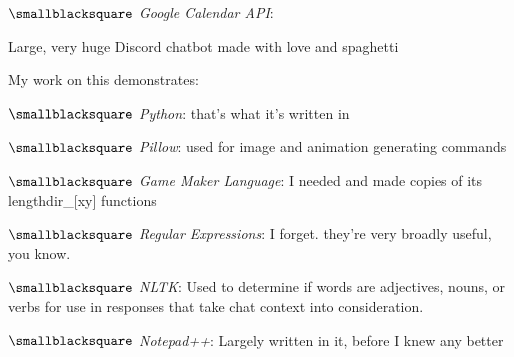 \documentclass[10mm,letterpaper,notitlepage]{article}
\begin{document}
{{								$\smallblacksquare$ \textit{Google Calendar API}: 
								
								\setlength{\parindent}{\parindent-4mm}
							\par}
							{\color[RGB]{0, 0, 0}
							\fontsize{2.25mm}{3.0mm}\selectfont
									{\color[RGB]{108, 29, 169}
									\fontsize{4.5mm}{6.0mm}\selectfont
									\color[RGB]{99, 94, 183}{{ }}
									\par}
							Large, very huge Discord chatbot made with love and spaghetti
							
							My work on this demonstrates:
								\setlength{\parindent}{\parindent+4mm}
								
								\nopagebreak
								$\smallblacksquare$ \textit{Python}: that's what it's written in
								
								$\smallblacksquare$ \textit{Pillow}: used for image and animation generating commands
								
								$\smallblacksquare$ \textit{Game Maker Language}: I needed and made copies of its lengthdir\_[xy] functions
								
								$\smallblacksquare$ \textit{Regular Expressions}: I forget. they're very broadly useful, you know.
								
								$\smallblacksquare$ \textit{NLTK}: Used to determine if words are adjectives, nouns, or verbs for use in responses that take chat context into consideration.
								
								$\smallblacksquare$ \textit{Notepad++}: Largely written in it, before I knew any better
								
}}
\end{document}
